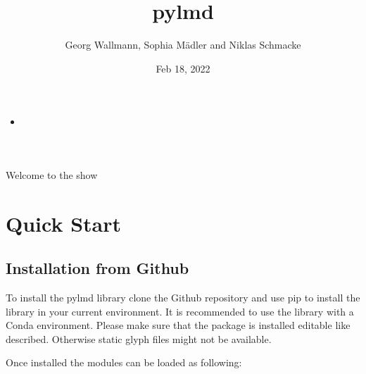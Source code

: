 \documentclass[a4paper,10pt,english,openany,oneside]{sphinxmanual}
\title{py\sphinxhyphen{}lmd}
\date{Feb 18, 2022}
\author{Georg Wallmann, Sophia Mädler and Niklas Schmacke}
\begin{document}
\pagestyle{empty}
\sphinxmaketitle
\pagestyle{plain}
\sphinxtableofcontents
\pagestyle{normal}
\label{\detokenize{index::doc}}


\begin{sphinxShadowBox}
\begin{itemize}
\item {} 
\sphinxAtStartPar
{}\label{\detokenize{index:id1}}{\hyperref[\detokenize{index:overview}]{}}

\end{itemize}
\end{sphinxShadowBox}

\sphinxAtStartPar
Welcome to the show


\chapter{Quick Start}
\label{\detokenize{pages/quickstart:quick-start}}\label{\detokenize{pages/quickstart::doc}}

\section{Installation from Github}
\label{\detokenize{pages/quickstart:installation-from-github}}
\sphinxAtStartPar
To install the py\sphinxhyphen{}lmd library clone the Github repository and use pip to install the library in your current environment. It is recommended to use the library with a Conda environment. Please make sure that the package is installed editable like described. Otherwise static glyph files might not be available.

\begin{sphinxVerbatim}[commandchars=\\\{\}]
  
   
\end{sphinxVerbatim}

\sphinxAtStartPar
Once installed the modules can be loaded as following:

\begin{sphinxVerbatim}[commandchars=\\\{\}]
    
\end{sphinxVerbatim}
\end{document}
